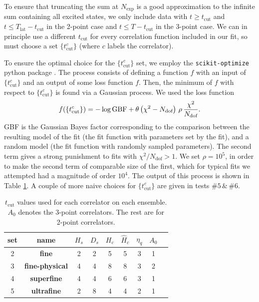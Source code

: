 To ensure that truncating the sum at $N_{\text{exp}}$ is a good approximation to the infinite sum containing all excited states, we only include data with  $t \geq t_{\text{cut}}$ and $t \leq T_{\text{lat}}-t_{\text{cut}}$ in the 2-point case and $t \leq T-t_{\text{cut}}$ in the 3-point case. We can in principle use a different $t_{\text{cut}}$ for every correlation function included in our fit, so must choose a set $\{ t_{\text{cut}}^{c}\}$ (where $c$ labels the correlator).

To ensure the optimal choice for the $\{ t_{\text{cut}}^{c}\}$ set, we employ the \texttt{scikit-optimize} python package \cite{skopt}. The process consists of defining a function $f$ with an input of $\{ t_{\text{cut}}^{c}\}$ and an output of some loss function $f$. Then, the minimum of $f$ with respect to $\{ t_{\text{cut}}^{c}\}$ is found via a Gaussian process. We used the loss function
\begin{align}
  f(\{ t_{\text{cut}}^{c}\}) = - \log \text{GBF} + \theta\left(\chi^2 - N_{\text{dof}}\right) \,\rho\, {\chi^2\over N_{\text{dof}}}.
\end{align}
GBF is the Gaussian Bayes factor corresponding to the comparison between the resulting model of the fit (the fit function with parameters set by the fit), and a random model (the fit function with randomly sampled parameters). The second term gives a strong punishment to fits with $\chi^2/N_{\text{dof}} > 1$. We set $\rho=10^5$, in order to make the second term of comparable size of the first, which for typical fits we attempted had a magnitude of order $10^4$. The output of this process is shown in Table \ref{tab:tcuts_BsDsstar}. A couple of more naive choices for $\{ t_{\text{cut}}^{c}\}$ are given in tests $\#5 \,\&\, \#6$. 

\begin{table}[htb!]
  \begin{center}
    \begin{tabular}{c c c c c c c c c}
      \hline
      set & name & $H_s$ & $D_s$ & $H_c$ & $\hat{H}_c$ & $\eta_q$ & $A_0$
      \\ [0.5ex]
      \hline
      2 & \bf{fine} & 2 & 2 & 5 & 5 & 3 & 1 
      \\ [1ex]
      3 & \bf{fine-physical} & 4 & 4 & 8 & 8 & 3 & 2
      \\ [1ex]
      4 & \bf{superfine} & 4 & 4 & 6 & 6 & 3 & 1
      \\ [1ex]
      5 & \bf{ultrafine} & 2 & 8 & 4 & 4 & 2 & 1
      \\ [1ex]
      \hline
    \end{tabular}
  \end{center}
  \caption{$t_{\text{cut}}$ values used for each correlator on each ensemble. $A_0$ denotes the 3-point correlators. The rest are for 2-point correlators. \label{tab:tcuts_BsDsstar}}
\end{table}

